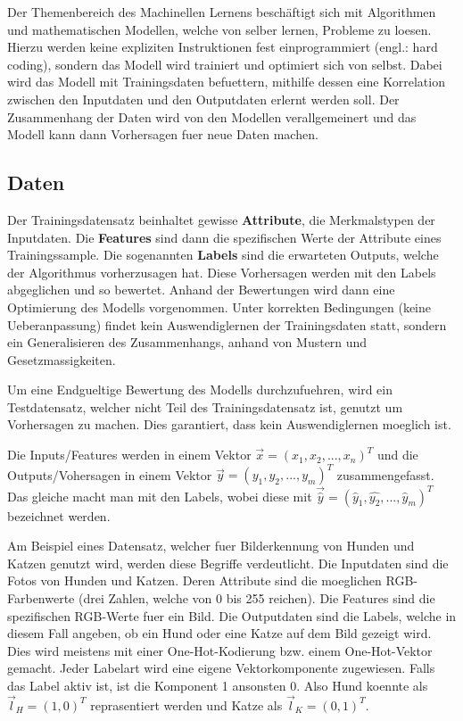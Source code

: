 \documentclass[../main]{subfiles}
\begin{document}
Der Themenbereich des Machinellen Lernens beschäftigt sich mit Algorithmen und mathematischen Modellen, welche von selber lernen, Probleme zu loesen.
Hierzu werden keine expliziten Instruktionen fest einprogrammiert (engl.: hard coding), sondern das Modell wird trainiert und optimiert sich von selbst.
Dabei wird das Modell mit Trainingsdaten befuettern, mithilfe dessen eine Korrelation zwischen den Inputdaten und den Outputdaten erlernt werden soll.
Der Zusammenhang der Daten wird von den Modellen verallgemeinert und das Modell kann dann Vorhersagen fuer neue Daten machen. 

\subsection{Daten}

Der Trainingsdatensatz beinhaltet gewisse \textbf{Attribute}, die Merkmalstypen der Inputdaten.
Die \textbf{Features} sind dann die spezifischen Werte der Attribute eines Trainingssample.
Die sogenannten \textbf{Labels} sind die erwarteten Outputs, welche der Algorithmus vorherzusagen hat.
Diese Vorhersagen werden mit den Labels abgeglichen und so bewertet.
Anhand der Bewertungen wird dann eine Optimierung des Modells vorgenommen.
Unter korrekten Bedingungen (keine Ueberanpassung) findet kein Auswendiglernen der Trainingsdaten statt,
sondern ein Generalisieren des Zusammenhangs, anhand von Mustern und Gesetzmassigkeiten.

Um eine Endgueltige Bewertung des Modells durchzufuehren, wird ein Testdatensatz, welcher nicht Teil des Trainingsdatensatz ist, genutzt um Vorhersagen zu machen.
Dies garantiert, dass kein Auswendiglernen moeglich ist.

Die Inputs/Features werden in einem Vektor $\vec{x}=(x_1,x_2,...,x_n)^T$ und die Outputs/Vohersagen in einem Vektor $\vec{y}=(y_1,y_2,...,y_m)^T$ zusammengefasst.
Das gleiche macht man mit den Labels, wobei diese mit $\vec{\hat{y}}=(\hat{y}_1,\hat{y_2},...,\hat{y}_m)^T$ bezeichnet werden.
\par \medskip
Am Beispiel eines Datensatz, welcher fuer Bilderkennung von Hunden und Katzen genutzt wird, werden diese Begriffe verdeutlicht.
Die Inputdaten sind die Fotos von Hunden und Katzen. Deren Attribute sind die moeglichen RGB-Farbenwerte (drei Zahlen, welche von 0 bis 255 reichen).
Die Features sind die spezifischen RGB-Werte fuer ein Bild. Die Outputdaten sind die Labels, welche in diesem Fall angeben, ob ein Hund oder eine Katze auf dem Bild gezeigt wird.
Dies wird meistens mit einer One-Hot-Kodierung bzw. einem One-Hot-Vektor gemacht. Jeder Labelart wird eine eigene Vektorkomponente zugewiesen. Falls das Label aktiv ist, ist die Komponent 1 ansonsten 0. Also Hund koennte als $\vec{l}_H=(1,0)^T$ reprasentiert werden und Katze als $\vec{l}_K=(0,1)^T$.
\end{document}
